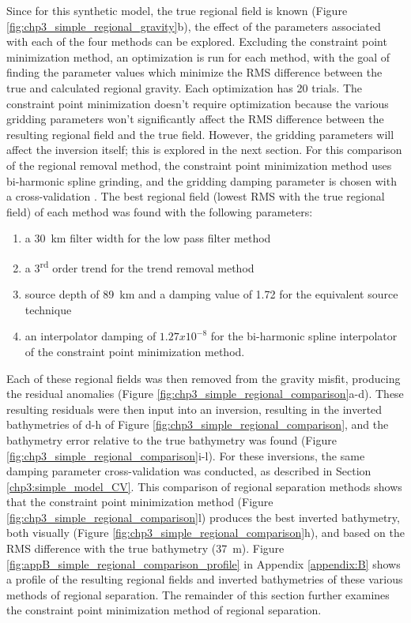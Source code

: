 Since for this synthetic model, the true regional field is known (Figure \ref{fig:chp3_simple_regional_gravity}b), the effect of the parameters associated with each of the four methods can be explored. Excluding the constraint point minimization method, an optimization is run for each method, with the goal of finding the parameter values which minimize the RMS difference between the true and calculated regional gravity. Each optimization has 20 trials. The constraint point minimization doesn't require optimization because the various gridding parameters won't significantly affect the RMS difference between the resulting regional field and the true field. However, the gridding parameters will affect the inversion itself; this is explored in the next section. For this comparison of the regional removal method, the constraint point minimization method uses bi-harmonic spline grinding, and the gridding damping parameter is chosen with a cross-validation \citep{uiedaverde2018}. The best regional field (lowest RMS with the true regional field) of each method was found with the following parameters: 
\begin{enumerate}
    \item a 30~km filter width for the low pass filter method
    \item a 3\textsuperscript{rd} order trend for the trend removal method
    \item source depth of 89~km and a damping value of 1.72 for the equivalent source technique
    \item an interpolator damping of $1.27x10^{-8}$ for the bi-harmonic spline interpolator of the constraint point minimization method. 
\end{enumerate}

Each of these regional fields was then removed from the gravity misfit, producing the residual anomalies (Figure \ref{fig:chp3_simple_regional_comparison}a-d). These resulting residuals were then input into an inversion, resulting in the inverted bathymetries of d-h of Figure \ref{fig:chp3_simple_regional_comparison}, and the bathymetry error relative to the true bathymetry was found (Figure \ref{fig:chp3_simple_regional_comparison}i-l). For these inversions, the same damping parameter cross-validation was conducted, as described in Section \ref{chp3:simple_model_CV}. This comparison of regional separation methods shows that the constraint point minimization method (Figure \ref{fig:chp3_simple_regional_comparison}l) produces the best inverted bathymetry, both visually (Figure \ref{fig:chp3_simple_regional_comparison}h), and based on the RMS difference with the true bathymetry (37~m). Figure \ref{fig:appB_simple_regional_comparison_profile} in Appendix \ref{appendix:B} shows a profile of the resulting regional fields and inverted bathymetries of these various methods of regional separation. The remainder of this section further examines the constraint point minimization method of regional separation.

